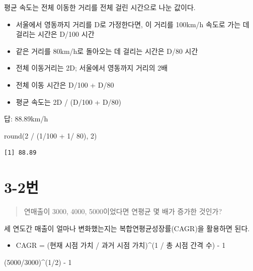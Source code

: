 \documentclass[
  letterpaper,
  DIV=11,
  numbers=noendperiod]{scrreprt}
\newenvironment{Shaded}{\begin{snugshade}}{\end{snugshade}}
\newcommand{\DecValTok}[1]{\textcolor[rgb]{0.68,0.00,0.00}{#1}}
\newcommand{\FunctionTok}[1]{\textcolor[rgb]{0.28,0.35,0.67}{#1}}
\newcommand{\NormalTok}[1]{\textcolor[rgb]{0.00,0.23,0.31}{#1}}
\newcommand{\SpecialCharTok}[1]{\textcolor[rgb]{0.37,0.37,0.37}{#1}}
\providecommand{\tightlist}{%
  \setlength{\itemsep}{0pt}\setlength{\parskip}{0pt}}\usepackage{longtable,booktabs,array}
\begin{document}
평균 속도는 전체 이동한 거리를 전체 걸린 시간으로 나눈 값이다.

\begin{itemize}
\tightlist
\item
  서울에서 영동까지 거리를 D로 가정한다면, 이 거리를 100km/h 속도로 가는
  데 걸리는 시간은 D/100 시간
\item
  같은 거리를 80km/h로 돌아오는 데 걸리는 시간은 D/80 시간
\item
  전체 이동거리는 2D; 서울에서 영동까지 거리의 2배
\item
  전체 이동 시간은 D/100 + D/80
\item
  평균 속도는 2D / (D/100 + D/80)
\end{itemize}

답: 88.89km/h

\begin{Shaded}
\begin{Highlighting}[]
\FunctionTok{round}\NormalTok{(}\DecValTok{2} \SpecialCharTok{/}\NormalTok{ (}\DecValTok{1}\SpecialCharTok{/}\DecValTok{100} \SpecialCharTok{+} \DecValTok{1}\SpecialCharTok{/} \DecValTok{80}\NormalTok{), }\DecValTok{2}\NormalTok{)}
\end{Highlighting}
\end{Shaded}

\begin{verbatim}
[1] 88.89
\end{verbatim}

\hypertarget{uxbc88-50}{%
\section*{3-2번}\label{uxbc88-50}}


\begin{quote}
연매출이 3000, 4000, 5000이었다면 연평균 몇 배가 증가한 것인가?
\end{quote}

세 연도간 매출이 얼마나 변화했는지는 복합연평균성장률(CAGR)을 활용하면
된다.

\begin{itemize}
\tightlist
\item
  CAGR = (현재 시점 가치 / 과거 시점 가치)\^{}(1 / 총 시점 간격 수) - 1
\end{itemize}

\begin{Shaded}
\begin{Highlighting}[]
\NormalTok{(}\DecValTok{5000}\SpecialCharTok{/}\DecValTok{3000}\NormalTok{)}\SpecialCharTok{\^{}}\NormalTok{(}\DecValTok{1}\SpecialCharTok{/}\DecValTok{2}\NormalTok{) }\SpecialCharTok{{-}} \DecValTok{1}
\end{Highlighting}
\end{Shaded}
\end{document}
